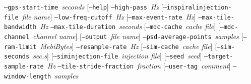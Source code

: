 \documentclass[10pt]{article}
\newcommand{\option}[1]{\texttt{#1}}
\newcommand{\parm}[1]{\textit{#1}}
\newenvironment{entry}%
{\begin{list}{}{\renewcommand{\makelabel}[1]%
{\parbox[b]{\labelwidth}{\makebox[0pt][l]{\textbf{##1}}\\}}%
\setlength{\labelwidth}{1em}%
\setlength{\labelsep}{1em}%
\setlength{\leftmargin}{2em}%
\setlength{\topsep}{\medskipamount}%
\setlength{\itemsep}{\medskipamount}%
\setlength{\parsep}{\medskipamount}%
\setlength{\listparindent}{0pt}}}
{\end{list}}
\begin{document}
\begin{entry}
\option{--gps-start-time}~\parm{seconds} \newline \hspace*{0.5in}
[\option{--help}] \newline \hspace*{0.5in}
\option{--high-pass}~\parm{Hz} \newline \hspace*{0.5in}
[\option{--inspiralinjection-file}~\parm{file name}] \newline \hspace*{0.5in}
\option{--low-freq-cutoff}~\parm{Hz} \newline \hspace*{0.5in}
[\option{--max-event-rate}~\parm{Hz}] \newline \hspace*{0.5in}
\option{--max-tile-bandwidth}~\parm{Hz} \newline \hspace*{0.5in}
\option{--max-tile-duration}~\parm{seconds} \newline \hspace*{0.5in}
[\option{--mdc-cache}~\parm{cache file}] \newline \hspace*{0.5in}
[\option{--mdc-channel}~\parm{channel name}] \newline \hspace*{0.5in}
[\option{--output}~\parm{file name}] \newline \hspace*{0.5in}
\option{--psd-average-points}~\parm{samples} \newline \hspace*{0.5in}
[\option{--ram-limit}~\parm{MebiBytes}] \newline \hspace*{0.5in}
\option{--resample-rate}~\parm{Hz} \newline \hspace*{0.5in}
[\option{--sim-cache}~\parm{cache file}] \newline \hspace*{0.5in}
[\option{--sim-seconds}~\parm{sec.s}] \newline \hspace*{0.5in}
[\option{--siminjection-file}~\parm{injection file}] \newline \hspace*{0.5in}
[\option{--seed}~\parm{seed}] \newline \hspace*{0.5in}
\option{--target-sample-rate}~\parm{Hz} \newline \hspace*{0.5in}
\option{--tile-stride-fraction}~\parm{fraction} \newline \hspace*{0.5in}
[\option{--user-tag}~\parm{comment}] \newline \hspace*{0.5in}
\option{--window-length}~\parm{samples} \newline \hspace*{0.5in}


\end{entry}
\end{document}
